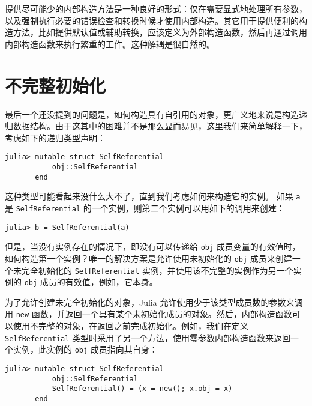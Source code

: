 提供尽可能少的内部构造方法是一种良好的形式：仅在需要显式地处理所有参数，以及强制执行必要的错误检查和转换时候才使用内部构造。其它用于提供便利的构造方法，比如提供默认值或辅助转换，应该定义为外部构造函数，然后再通过调用内部构造函数来执行繁重的工作。这种解耦是很自然的。



\hypertarget{7871769496419060352}{}


\section{不完整初始化}



最后一个还没提到的问题是，如何构造具有自引用的对象，更广义地来说是构造递归数据结构。由于这其中的困难并不是那么显而易见，这里我们来简单解释一下，考虑如下的递归类型声明：




\begin{verbatim}
julia> mutable struct SelfReferential
           obj::SelfReferential
       end

\end{verbatim}



这种类型可能看起来没什么大不了，直到我们考虑如何来构造它的实例。 如果 \texttt{a} 是 \texttt{SelfReferential} 的一个实例，则第二个实例可以用如下的调用来创建：




\begin{verbatim}
julia> b = SelfReferential(a)
\end{verbatim}



但是，当没有实例存在的情况下，即没有可以传递给 \texttt{obj} 成员变量的有效值时，如何构造第一个实例？唯一的解决方案是允许使用未初始化的 \texttt{obj} 成员来创建一个未完全初始化的 \texttt{SelfReferential} 实例，并使用该不完整的实例作为另一个实例的 \texttt{obj} 成员的有效值，例如，它本身。



为了允许创建未完全初始化的对象，Julia 允许使用少于该类型成员数的参数来调用 \href{@ ref}{\texttt{new}} 函数，并返回一个具有某个未初始化成员的对象。然后，内部构造函数可以使用不完整的对象，在返回之前完成初始化。例如，我们在定义 \texttt{SelfReferential} 类型时采用了另一个方法，使用零参数内部构造函数来返回一个实例，此实例的 \texttt{obj} 成员指向其自身：




\begin{verbatim}
julia> mutable struct SelfReferential
           obj::SelfReferential
           SelfReferential() = (x = new(); x.obj = x)
       end

\end{verbatim}




